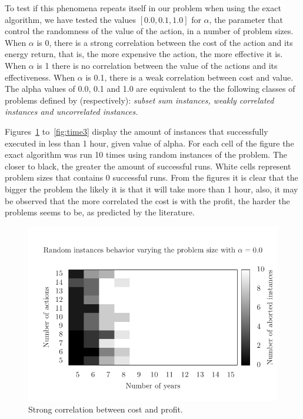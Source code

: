To test if this phenomena repeats itself in our problem when using the exact algorithm, we have tested the values $[0.0, 0.1, 1.0]$ for $\alpha$,
the parameter that control the randomness of the value of the action, in a number of problem sizes. When $\alpha$ is 0,
there is a strong correlation between the cost of the action and its energy return, that is,
the more expensive the action, the more effective it is. When $\alpha$ is 1 there is no correlation
between the value of the actions and its effectiveness. When $\alpha$ is 0.1, there is a weak correlation between cost and value.
The alpha values of 0.0, 0.1 and 1.0 are equivalent to the the following classes of problems defined by \cite{Pisinger05whereare} (respectively): 
\textit{subset sum instances, weakly correlated instances and uncorrelated instances.}

Figures~\ref{fig:time1} to~\ref{fig:time3} display the amount of instances that successfully executed in less than 1 hour,
given value of alpha. For each cell of the figure the exact algorithm was run 10 times using random instances of the problem.
The closer to black, the greater the amount of successful runs. White cells represent problem sizes that contains 0 successful
runs.  From the figures it is clear that the bigger the problem the likely it is that it will take more than 1 hour, also, it may be observed that the more
correlated the cost is with the profit, the harder the problems seems to be, as predicted by the literature.

\begin{figure}
\centering
\includegraphics[scale=0.73, trim=1cm 0 0 0]{figs/very_hard.pdf}
\caption{Strong correlation between cost and profit.}
\label{fig:time1}
\end{figure}

